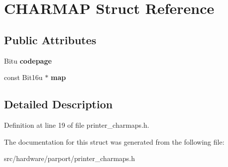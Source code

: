 \hypertarget{structCHARMAP}{\section{C\-H\-A\-R\-M\-A\-P Struct Reference}
\label{structCHARMAP}
}
\subsection*{Public Attributes}
\begin{DoxyCompactItemize}
\item 
\hypertarget{structCHARMAP_a4381a41290a5adbfb4944bdd72113c57}{Bitu {\bfseries codepage}}\label{structCHARMAP_a4381a41290a5adbfb4944bdd72113c57}

\item 
\hypertarget{structCHARMAP_ae6e1767d336d81fcc508fc7df8354e03}{const Bit16u $\ast$ {\bfseries map}}\label{structCHARMAP_ae6e1767d336d81fcc508fc7df8354e03}

\end{DoxyCompactItemize}


\subsection{Detailed Description}


Definition at line 19 of file printer\-\_\-charmaps.\-h.



The documentation for this struct was generated from the following file\-:\begin{DoxyCompactItemize}
\item 
src/hardware/parport/printer\-\_\-charmaps.\-h\end{DoxyCompactItemize}
